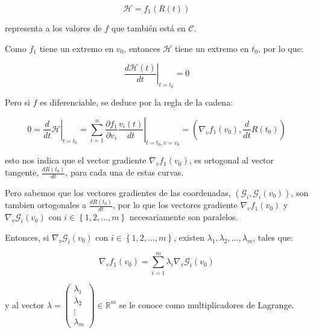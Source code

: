             \begin{equation}
                \mathscr{H} = f_1(R(t))
            \end{equation}

            representa a los valores de $f$  que también está en $\mathscr{C}$.

            Como $f_1$ tiene un extremo en $v_0$, entonces $\mathscr{H}$ tiene un extremo en $t_0$, por lo que:

            \begin{equation}
                \left. \frac{d \mathscr{H}(t)}{dt} \right|_{t=t_0} = 0
            \end{equation}

            Pero si $f$ es diferenciable, se deduce por la regla de la cadena:

            \begin{equation}
                0 = \left. \frac{d}{dt} \mathscr{H} \right|_{t=t_0} = \left. \sum_{i=1}^n \frac{\partial f_1}{\partial v_i} \frac{v_i(t)}{dt} \right|_{t=t_0, v=v_0} = \left( \nabla_v f_1(v_0), \frac{d}{dt} R(t_0) \right)
            \end{equation}

            esto nos indica que el vector gradiente $\nabla_v f_1(v_0)$, es ortogonal al vector tangente, $\frac{d R(t_0)}{dt}$, para cada una de estas curvas.

            Pero sabemos que los vectores gradientes de las coordenadas, $\left( \mathscr{G}_i, \mathscr{G}_i(v_0) \right)$, son tambien ortogonales a $\frac{d R(t_0)}{dt}$, por lo que los vectores gradiente $\nabla_v f_1(v_0)$ y $\nabla_v \mathscr{G}_i(v_0)$ con $i \in \left\{ 1, 2, \dots, m \right\}$ necesariamente son paralelos.

            Entonces, si $\nabla_v \mathscr{G}_i(v_0)$ con $i \in \left\{ 1, 2, \dots, m \right\}$, existen $\lambda_1, \lambda_2, \dots, \lambda_m$, tales que:

            \begin{equation}
                \nabla_v f_1(v_0) = \sum_{i=1}^m \lambda_i \nabla_v \mathscr{G}_i(v_0)
            \end{equation}

            y al vector $\lambda = \begin{pmatrix} \lambda_1 \\ \lambda_2 \\ \vdots \\ \lambda_m \end{pmatrix} \in \mathbb{R}^m$ se le conoce como multiplicadores de Lagrange.

